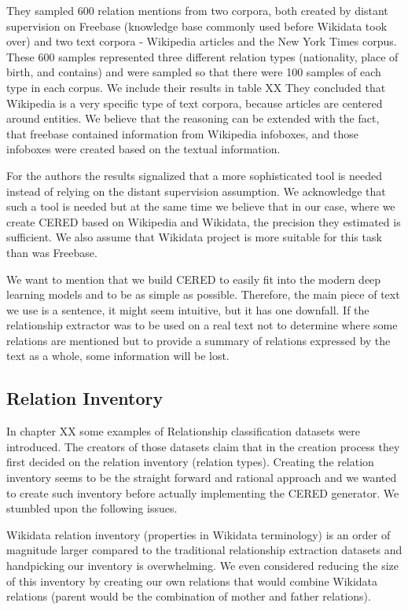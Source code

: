 They sampled 600 relation mentions from two corpora, both created by distant supervision on Freebase (knowledge base commonly used before Wikidata took over) and two text corpora - Wikipedia articles and the New York Times corpus. These 600 samples represented three different relation types (nationality, place of birth, and contains) and were sampled so that there were 100 samples of each type in each corpus. We include their results in table XX  They concluded that Wikipedia is a very specific type of text corpora, because articles are centered around entities. We believe that the reasoning can be extended with the fact, that freebase contained information from Wikipedia infoboxes, and those infoboxes were created based on the textual information. 

For the authors the results signalized that a more sophisticated tool is needed instead of relying on the distant supervision assumption. We acknowledge that such a tool is needed but at the same time we believe that in our case, where we create CERED based on Wikipedia and Wikidata, the precision they estimated is sufficient. We also assume that Wikidata project is more suitable for this task than was Freebase.

We want to mention that we build CERED to easily fit into the modern deep learning models and to be as simple as possible. Therefore, the main piece of text we use is a sentence, it might seem intuitive, but it has one downfall. If the relationship extractor was to be used on a real text not to determine where some relations are mentioned but to provide a summary of relations expressed by the text as a whole, some information will be lost. 

\subsection{Relation Inventory}
In chapter XX some examples of Relationship classification datasets were introduced. The creators of those datasets claim that in the creation process they first decided on the relation inventory (relation types).  Creating the relation inventory seems to be the straight forward and rational approach and we wanted to create such inventory before actually implementing the CERED generator. We stumbled upon the following issues.

Wikidata relation inventory (properties in Wikidata terminology) is an order of magnitude larger compared to the traditional relationship extraction datasets and handpicking our inventory is overwhelming. We even considered reducing the size of this inventory by creating our own relations that would combine Wikidata relations (parent would be the combination of mother and father relations). 

